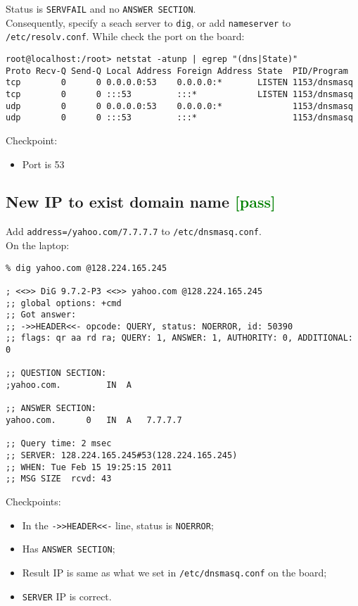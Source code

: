 \documentclass[a4paper]{report}
\begin{document}
Status is {\tt SERVFAIL} and no {\tt ANSWER SECTION}.\\
Consequently, specify a seach server to {\tt dig}, or add {\tt nameserver} to
{\tt /etc/resolv.conf}.
While check the port on the board:
\begin{lstlisting}
root@localhost:/root> netstat -atunp | egrep "(dns|State)"
Proto Recv-Q Send-Q Local Address Foreign Address State  PID/Program
tcp        0      0 0.0.0.0:53    0.0.0.0:*       LISTEN 1153/dnsmasq        
tcp        0      0 :::53         :::*            LISTEN 1153/dnsmasq        
udp        0      0 0.0.0.0:53    0.0.0.0:*              1153/dnsmasq        
udp        0      0 :::53         :::*                   1153/dnsmasq
\end{lstlisting}
Checkpoint:
\begin{itemize}
    \item Port is 53
\end{itemize}
\subsection{New IP to exist domain name \textcolor{green}{[pass]}}
Add {\tt address=/yahoo.com/7.7.7.7} to {\tt /etc/dnsmasq.conf}.\\
On the laptop:
\begin{lstlisting}
% dig yahoo.com @128.224.165.245    

; <<>> DiG 9.7.2-P3 <<>> yahoo.com @128.224.165.245
;; global options: +cmd
;; Got answer:
;; ->>HEADER<<- opcode: QUERY, status: NOERROR, id: 50390
;; flags: qr aa rd ra; QUERY: 1, ANSWER: 1, AUTHORITY: 0, ADDITIONAL: 0

;; QUESTION SECTION:
;yahoo.com.			IN	A

;; ANSWER SECTION:
yahoo.com.		0	IN	A	7.7.7.7

;; Query time: 2 msec
;; SERVER: 128.224.165.245#53(128.224.165.245)
;; WHEN: Tue Feb 15 19:25:15 2011
;; MSG SIZE  rcvd: 43

\end{lstlisting}
Checkpoints:
\begin{itemize}
    \item In the {\tt ->>HEADER<<-} line, status is {\tt NOERROR};
    \item Has {\tt ANSWER SECTION};
    \item Result IP is same as what we set in {\tt /etc/dnsmasq.conf} on the board;
    \item {\tt SERVER} IP is correct.
\end{itemize}
\end{document}
